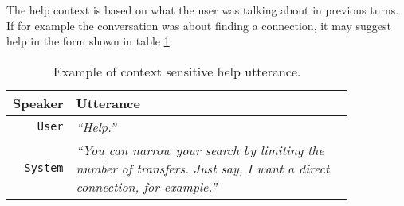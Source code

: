 The help context is based on what the user was talking about in previous turns.
If for example the conversation was about finding a connection, it may suggest help in the form shown in table \ref{table:help}.

\begin{table}[h!]
\centering
\begin{tabular}{ | r | p{0.85\linewidth} | } \hline
	\textbf{Speaker} & \textbf{Utterance} \\ \hline
	\texttt{User} & \textit{``Help.''} \\ \hline
	\texttt{System} & \textit{``You can narrow your search by limiting the number of transfers.
	Just say, I want a direct connection, for example.''} \\ \hline
\end{tabular}
\caption[Context sensitive help]{Example of context sensitive help utterance.}
\label{table:help}
\end{table}






